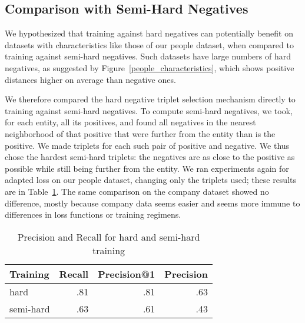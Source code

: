 \subsection{Comparison with Semi-Hard Negatives}
We hypothesized that training against hard negatives can potentially benefit on datasets with characteristics like those of our people dataset, when compared to training against semi-hard negatives.  Such datasets have large numbers of hard negatives, as suggested by Figure~\ref{people_characteristics}, which shows positive distances higher on average than negative ones.  

We therefore compared the hard negative triplet selection mechanism directly to training against semi-hard negatives.  To compute semi-hard negatives, we took, for each entity, all its positives, and found all negatives in the nearest neighborhood of that positive that were further from the entity than is the positive.  We made triplets for each such pair of positive and negative.  We thus chose the hardest semi-hard triplets: the negatives are as close to the positive as possible while still being further from the entity.  We ran experiments again for adapted loss on our people dataset, changing only the triplets used; these results are in Table~\ref{hard-semi-hard}.  The same comparison on the company dataset showed no difference, mostly because company data seems easier and seems more immune to differences in loss functions or training regimens.

\begin{table}[ht]
\caption{Precision and Recall for hard and semi-hard training}
\label{hard-semi-hard}
\begin{center}
\begin{tabular}{|l|r|r|r|}
\hline
Training & Recall & Precision@1 & Precision \\
\hline
hard & .81 & .81 & .63 \\
\hline
semi-hard & .63 & .61 & .43 \\
\hline
\end{tabular}%
\end{center}
\end{table}

